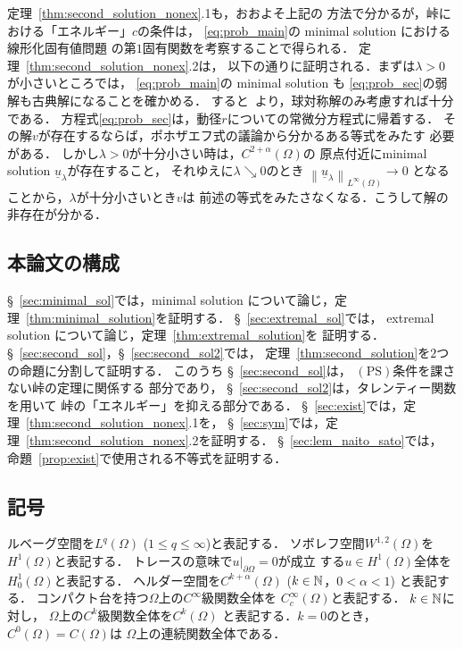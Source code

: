 定理~\ref{thm:second_solution_nonex}.1も，おおよそ上記の
方法で分かるが，峠における「エネルギー」$c$の条件は，
\ref{eq:prob_main}の minimal solution における線形化固有値問題
の第$1$固有関数を考察することで得られる．
定理~\ref{thm:second_solution_nonex}.2は，
以下の通りに証明される．まずは$\lambda > 0$が小さいところでは，
\ref{eq:prob_main}の minimal solution も
\ref{eq:prob_sec}の弱解も古典解になることを確かめる．
すると\cite{MR544879}~より，球対称解のみ考慮すれば十分である．
方程式\ref{eq:prob_sec}は，動径$r$についての常微分方程式に帰着する．
その解$v$が存在するならば，ポホザエフ式の議論から分かるある等式をみたす
必要がある．
しかし$\lambda > 0$が十分小さい時は，$C^{2 + \alpha}(\Omega)$の
原点付近にminimal solution $\underline{u}_\lambda$が存在すること，
それゆえに$\lambda \searrow 0$のとき
$\left\| \underline{u}_\lambda \right\|_{L^\infty(\Omega)} \to 0$
となることから，$\lambda$が十分小さいとき$v$は
前述の等式をみたさなくなる．こうして解の非存在が分かる．

\subsection{本論文の構成}

\S~\ref{sec:minimal_sol}では，minimal solution について論じ，定
理~\ref{thm:minimal_solution}を証明する．
\S~\ref{sec:extremal_sol}では，
extremal solution について論じ，定理~\ref{thm:extremal_solution}を
証明する．
\S~\ref{sec:second_sol}，\S~\ref{sec:second_sol2}では，
定理~\ref{thm:second_solution}を$2$つの命題に分割して証明する．
このうち
\S~\ref{sec:second_sol}は，
$(\mathrm{PS})$条件を課さない峠の定理に関係する
部分であり，
\S~\ref{sec:second_sol2}は，タレンティー関数を用いて
峠の「エネルギー」を抑える部分である．
\S~\ref{sec:exist}では，定理~\ref{thm:second_solution_nonex}.1を，
\S~\ref{sec:sym}では，定理~\ref{thm:second_solution_nonex}.2を証明する．
\S~\ref{sec:lem_naito_sato}では，
命題~\ref{prop:exist}で使用される不等式を証明する．

\subsection{記号}

ルベーグ空間を$L^q(\Omega)$ ($1 \leq q \leq \infty$)と表記する．
ソボレフ空間$W^{1, 2}(\Omega)$を$H^1(\Omega)$と表記する．
トレースの意味で$u |_{\partial \Omega} = 0$が成立
する$u \in H^1(\Omega)$全体を$H_0^1(\Omega)$と表記する．
ヘルダー空間を$C^{k + \alpha}(\Omega)$ ($k \in \mathbb{N}$，$0 < \alpha < 1$)
と表記する．
コンパクト台を持つ$\Omega$上の$C^\infty$級関数全体を
$C^\infty_c (\Omega)$と表記する．
$k \in \mathbb{N}$に対し，
$\Omega$上の$C^k$級関数全体を$C^k(\Omega)$
と表記する．$k = 0$のとき，$C^0(\Omega) = C(\Omega)$は
$\Omega$上の連続関数全体である．

